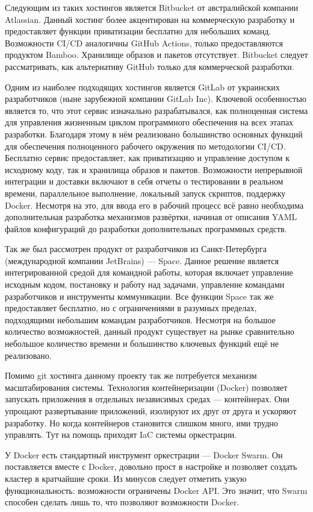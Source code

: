 Следующим из таких хостингов является Bitbucket от австралийской компании Atlassian.
Данный хостинг более акцентирован на коммерческую разработку и предоставляет функции приватизации бесплатно для небольших команд.
Возможности CI/CD аналогичны GitHub Actions, только предоставляются продуктом Bamboo.
Хранилище образов и пакетов отсутствует.
Bitbucket следует рассматривать, как альтернативу GitHub только для коммерческой разработки.

Одним из наиболее подходящих хостингов является GitLab от украинских разработчиков (ныне зарубежной компании GitLab Inc).
Ключевой особенностью является то, что этот сервис изначально разрабатывался,
как полноценная система для управления жизненным циклом программного обеспечения на всех этапах разработки.
Благодаря этому в нём реализовано большинство основных функций для обеспечения полноценного рабочего окружения по методологии CI/CD.
Бесплатно сервис предоставляет, как приватизацию и управление доступом к исходному коду, так и хранилища образов и пакетов.
Возможности непрерывной интеграции и доставки включают в себя отчеты о тестировании в реальном времени, параллельное выполнение, локальный запуск скриптов, поддержку Docker.
Несмотря на это, для ввода его в рабочий процесс всё равно необходима дополнительная разработка механизмов развёртки,
начиная от описания YAML файлов конфигураций до разработки дополнительных программных средств.

Так же был рассмотрен продукт от разработчиков из Санкт-Петербурга (международной компании JetBrains) --- Space.
Данное решение является интегрированной средой для командной работы, которая включает управление исходным кодом, постановку и работу над задачами, управление командами разработчиков и инструменты коммуникации.
Все функции Space так же предоставляет бесплатно, но с ограничениями в разумных пределах, подходящими небольшим командам разработчиков.
Несмотря на большое количество возможностей, данный продукт существует на рынке сравнительно небольшое количество времени и большинство ключевых функций ещё не реализовано.

Помимо git хостинга данному проекту так же потребуется механизм масштабирования системы.
Технология контейнеризации (Docker) позволяет запускать приложения в отдельных независимых средах --- контейнерах.
Они упрощают развертывание приложений, изолируют их друг от друга и ускоряют разработку.
Но когда контейнеров становится слишком много, ими трудно управлять.
Тут на помощь приходят IaC системы оркестрации.

У Docker есть стандартный инструмент оркестрации --- Docker Swarm.
Он поставляется вместе с Docker, довольно прост в настройке и позволяет создать кластер в кратчайшие сроки.
Из минусов следует отметить узкую функциональность: возможности ограничены Docker API.
Это значит, что Swarm способен сделать лишь то, что позволяют возможности Docker.

